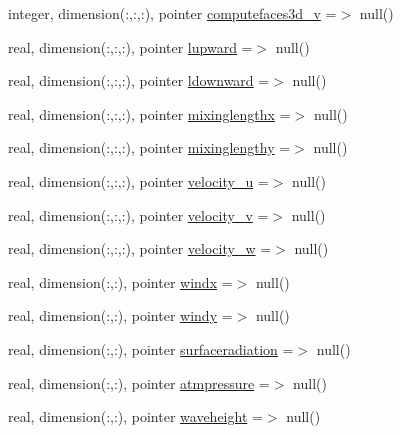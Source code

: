 \begin{DoxyCompactItemize}
\item 
integer, dimension(\+:,\+:,\+:), pointer \mbox{\hyperlink{structmodulelagrangianglobal_1_1t__eulermodel_ae38c9f25dfc609cc8f59cb43a64df94c}{computefaces3d\+\_\+v}} =$>$ null()
\item 
real, dimension(\+:,\+:,\+:), pointer \mbox{\hyperlink{structmodulelagrangianglobal_1_1t__eulermodel_a939790de09b4e73ae3fb502ca6e18289}{lupward}} =$>$ null()
\item 
real, dimension(\+:,\+:,\+:), pointer \mbox{\hyperlink{structmodulelagrangianglobal_1_1t__eulermodel_a2de01f43fe113fac146e1d98b0472051}{ldownward}} =$>$ null()
\item 
real, dimension(\+:,\+:,\+:), pointer \mbox{\hyperlink{structmodulelagrangianglobal_1_1t__eulermodel_ac34d2e8cef6e9f9bec6ece87d20927ec}{mixinglengthx}} =$>$ null()
\item 
real, dimension(\+:,\+:,\+:), pointer \mbox{\hyperlink{structmodulelagrangianglobal_1_1t__eulermodel_ae244b291c06d4d25d6db6762c55d466b}{mixinglengthy}} =$>$ null()
\item 
real, dimension(\+:,\+:,\+:), pointer \mbox{\hyperlink{structmodulelagrangianglobal_1_1t__eulermodel_a99eb906854c2810f37441a1178ee55d9}{velocity\+\_\+u}} =$>$ null()
\item 
real, dimension(\+:,\+:,\+:), pointer \mbox{\hyperlink{structmodulelagrangianglobal_1_1t__eulermodel_a83251612ef39dc72aabb0dd2a719a322}{velocity\+\_\+v}} =$>$ null()
\item 
real, dimension(\+:,\+:,\+:), pointer \mbox{\hyperlink{structmodulelagrangianglobal_1_1t__eulermodel_ac4ecb3ae32d88a14da1a1e5920c82c6f}{velocity\+\_\+w}} =$>$ null()
\item 
real, dimension(\+:,\+:), pointer \mbox{\hyperlink{structmodulelagrangianglobal_1_1t__eulermodel_ab4407430712dee8809508f85178f75e3}{windx}} =$>$ null()
\item 
real, dimension(\+:,\+:), pointer \mbox{\hyperlink{structmodulelagrangianglobal_1_1t__eulermodel_a039f3a925f0a5b343d11a0ef8170cf5e}{windy}} =$>$ null()
\item 
real, dimension(\+:,\+:), pointer \mbox{\hyperlink{structmodulelagrangianglobal_1_1t__eulermodel_a958333321f40662329f05228438cfa79}{surfaceradiation}} =$>$ null()
\item 
real, dimension(\+:,\+:), pointer \mbox{\hyperlink{structmodulelagrangianglobal_1_1t__eulermodel_a03b939a60ae8dceb4bf6b0d2c7bab037}{atmpressure}} =$>$ null()
\item 
real, dimension(\+:,\+:), pointer \mbox{\hyperlink{structmodulelagrangianglobal_1_1t__eulermodel_a6d39b44e61bb65296426bddad60facac}{waveheight}} =$>$ null()

\end{DoxyCompactItemize}

